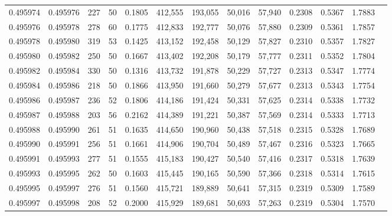 \begin{tabular}{rrrrrrrrrrrrr}
0.495974 & 0.495976 &   227 &  50 &                                     0.1805 & 412,555 & 193,055 &  50,016 &  57,940 & 0.2308 & 0.5367 & 1.7883 \\
0.495976 & 0.495978 &   278 &  60 &                                     0.1775 & 412,833 & 192,777 &  50,076 &  57,880 & 0.2309 & 0.5361 & 1.7857 \\
0.495978 & 0.495980 &   319 &  53 &                                     0.1425 & 413,152 & 192,458 &  50,129 &  57,827 & 0.2310 & 0.5357 & 1.7827 \\
0.495980 & 0.495982 &   250 &  50 &                                     0.1667 & 413,402 & 192,208 &  50,179 &  57,777 & 0.2311 & 0.5352 & 1.7804 \\
0.495982 & 0.495984 &   330 &  50 &                                     0.1316 & 413,732 & 191,878 &  50,229 &  57,727 & 0.2313 & 0.5347 & 1.7774 \\
0.495984 & 0.495986 &   218 &  50 &                                     0.1866 & 413,950 & 191,660 &  50,279 &  57,677 & 0.2313 & 0.5343 & 1.7754 \\
0.495986 & 0.495987 &   236 &  52 &                                     0.1806 & 414,186 & 191,424 &  50,331 &  57,625 & 0.2314 & 0.5338 & 1.7732 \\
0.495987 & 0.495988 &   203 &  56 &                                     0.2162 & 414,389 & 191,221 &  50,387 &  57,569 & 0.2314 & 0.5333 & 1.7713 \\
0.495988 & 0.495990 &   261 &  51 &                                     0.1635 & 414,650 & 190,960 &  50,438 &  57,518 & 0.2315 & 0.5328 & 1.7689 \\
0.495990 & 0.495991 &   256 &  51 &                                     0.1661 & 414,906 & 190,704 &  50,489 &  57,467 & 0.2316 & 0.5323 & 1.7665 \\
0.495991 & 0.495993 &   277 &  51 &                                     0.1555 & 415,183 & 190,427 &  50,540 &  57,416 & 0.2317 & 0.5318 & 1.7639 \\
0.495993 & 0.495995 &   262 &  50 &                                     0.1603 & 415,445 & 190,165 &  50,590 &  57,366 & 0.2318 & 0.5314 & 1.7615 \\
0.495995 & 0.495997 &   276 &  51 &                                     0.1560 & 415,721 & 189,889 &  50,641 &  57,315 & 0.2319 & 0.5309 & 1.7589 \\
0.495997 & 0.495998 &   208 &  52 &                                     0.2000 & 415,929 & 189,681 &  50,693 &  57,263 & 0.2319 & 0.5304 & 1.7570 \\

\end{tabular}
